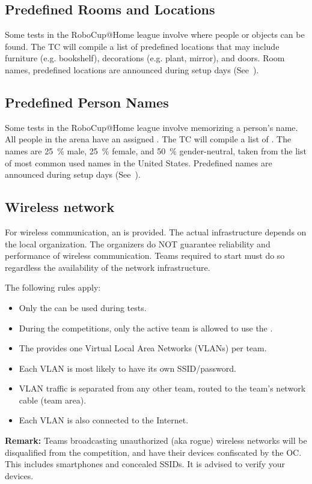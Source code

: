 \subsection{Predefined Rooms and Locations}
\label{rule:scenario_locations}
Some tests in the RoboCup@Home league involve  where people or objects can be found.
The TC will compile a list of predefined locations that may include furniture (e.g. bookshelf), decorations (e.g. plant, mirror), and doors.
Room names, predefined locations are announced during setup days (See~).



\subsection{Predefined Person Names}\label{rule:scenario_names}
Some tests in the RoboCup@Home league involve memorizing a person's name.
All people in the arena have an assigned .
The TC will compile a list of \NumNames {}.
The names are \SI{25}{\percent} male, \SI{25}{\percent} female, and \SI{50}{\percent} gender-neutral, taken from the list of most common used names in the United States.
Predefined names are announced during setup days (See~).


\subsection{Wireless network}
\label{rule:scenario_wifi}

For wireless communication, an  is provided. The actual infrastructure depends on the local organization.
The organizers do NOT guarantee reliability and performance of wireless communication.
Teams required to start must do so regardless the availability of the network infrastructure.

The following rules apply:

\begin{itemize}
	\item Only the  can be used during tests.
	\item During the competitions, only the active team is allowed to use the .
	\item The  provides one Virtual Local Area Networks (VLANs) per team.
	\item Each VLAN is most likely to have its own SSID/password.
	\item VLAN traffic is separated from any other team, routed to the team's network cable (team area).
	\item Each VLAN is also connected to the Internet.
\end{itemize}

\indent\textbf{Remark:} Teams broadcasting unauthorized (aka rogue) wireless networks will be disqualified from the competition, and have their devices confiscated by the OC.
This includes smartphones and concealed SSIDs.
It is advised to verify your devices.


